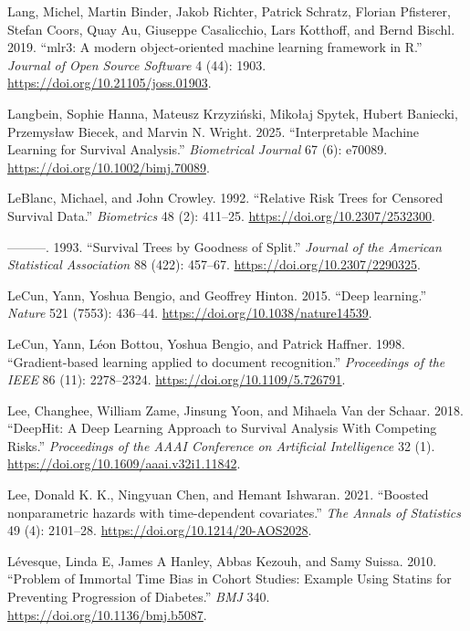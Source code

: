 \documentclass[
  letterpaper,
  krantz2]{style/krantz}
\newlength{\cslhangindent}
\newenvironment{CSLReferences}[2] %
 {\begin{list}{}{%
  \setlength{\itemindent}{0pt}
  \setlength{\leftmargin}{0pt}
  \setlength{\parsep}{0pt}
  \ifodd #1
   \setlength{\leftmargin}{\cslhangindent}
   \setlength{\itemindent}{-1\cslhangindent}
  \fi
  \setlength{\itemsep}{#2\baselineskip}}}
 {\end{list}}
\begin{document}
\begin{CSLReferences}{1}{0}
Lang, Michel, Martin Binder, Jakob Richter, Patrick Schratz, Florian
Pfisterer, Stefan Coors, Quay Au, Giuseppe Casalicchio, Lars Kotthoff,
and Bernd Bischl. 2019. {``{mlr3: A modern object-oriented machine
learning framework in R}.''} \emph{Journal of Open Source Software} 4
(44): 1903. \url{https://doi.org/10.21105/joss.01903}.

Langbein, Sophie Hanna, Mateusz Krzyziński, Mikołaj Spytek, Hubert
Baniecki, Przemysław Biecek, and Marvin N. Wright. 2025.
{``Interpretable {Machine Learning} for {Survival Analysis}.''}
\emph{Biometrical Journal} 67 (6): e70089.
\url{https://doi.org/10.1002/bimj.70089}.

LeBlanc, Michael, and John Crowley. 1992. {``{Relative Risk Trees for
Censored Survival Data}.''} \emph{Biometrics} 48 (2): 411--25.
\url{https://doi.org/10.2307/2532300}.

---------. 1993. {``{Survival Trees by Goodness of Split}.''}
\emph{Journal of the American Statistical Association} 88 (422):
457--67. \url{https://doi.org/10.2307/2290325}.

LeCun, Yann, Yoshua Bengio, and Geoffrey Hinton. 2015. {``{Deep
learning}.''} \emph{Nature} 521 (7553): 436--44.
\url{https://doi.org/10.1038/nature14539}.

LeCun, Yann, Léon Bottou, Yoshua Bengio, and Patrick Haffner. 1998.
{``{Gradient-based learning applied to document recognition}.''}
\emph{Proceedings of the IEEE} 86 (11): 2278--2324.
\url{https://doi.org/10.1109/5.726791}.

Lee, Changhee, William Zame, Jinsung Yoon, and Mihaela Van der Schaar.
2018. {``{DeepHit: A Deep Learning Approach to Survival Analysis With
Competing Risks}.''} \emph{Proceedings of the AAAI Conference on
Artificial Intelligence} 32 (1).
\url{https://doi.org/10.1609/aaai.v32i1.11842}.

Lee, Donald K. K., Ningyuan Chen, and Hemant Ishwaran. 2021. {``{Boosted
nonparametric hazards with time-dependent covariates}.''} \emph{The
Annals of Statistics} 49 (4): 2101--28.
\url{https://doi.org/10.1214/20-AOS2028}.

Lévesque, Linda E, James A Hanley, Abbas Kezouh, and Samy Suissa. 2010.
{``Problem of Immortal Time Bias in Cohort Studies: Example Using
Statins for Preventing Progression of Diabetes.''} \emph{BMJ} 340.
\url{https://doi.org/10.1136/bmj.b5087}.


\end{CSLReferences}
\end{document}
